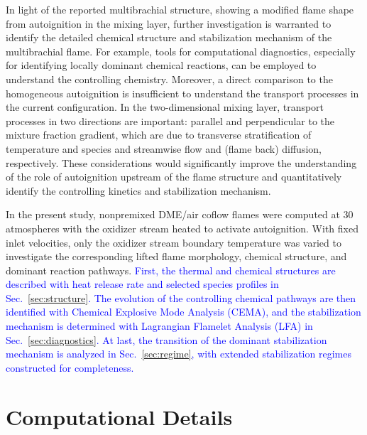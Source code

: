 \documentclass[review,3p,times]{elsarticle}
\begin{document}
In light of the reported multibrachial structure, showing a modified flame shape from autoignition in the mixing layer, further investigation is warranted to identify the detailed chemical structure and stabilization mechanism of the multibrachial flame.  For example, tools for computational diagnostics, especially for identifying locally dominant chemical reactions, can be employed to understand the controlling chemistry.  Moreover, a direct comparison to the homogeneous autoignition is insufficient to understand the transport processes in the current configuration.  In the two-dimensional mixing layer, transport processes in two directions are important: parallel and perpendicular to the mixture fraction gradient, which are due to transverse stratification of temperature and species and streamwise flow and (flame back) diffusion, respectively.  These considerations would significantly improve the understanding of the role of autoignition upstream of the flame structure and quantitatively identify the controlling kinetics and stabilization mechanism.     

In the present study, nonpremixed DME/air coflow flames were computed at $30$ atmospheres with the oxidizer stream heated to activate autoignition.  With fixed inlet velocities, only the oxidizer stream boundary temperature was varied to investigate the corresponding lifted flame morphology, chemical structure, and dominant reaction pathways.  \textcolor{blue}{First, the thermal and chemical structures are described with heat release rate and selected species profiles in Sec.~\ref{sec:structure}.  The evolution of the controlling chemical pathways are then identified with Chemical Explosive Mode Analysis (CEMA), and the stabilization mechanism is determined with Lagrangian Flamelet Analysis (LFA) in Sec.~\ref{sec:diagnostics}.  At last, the transition of the dominant stabilization mechanism is analyzed in Sec.~\ref{sec:regime}, with extended stabilization regimes constructed for completeness.}

 

\section{Computational Details} \label{sec:computation}
\end{document}
